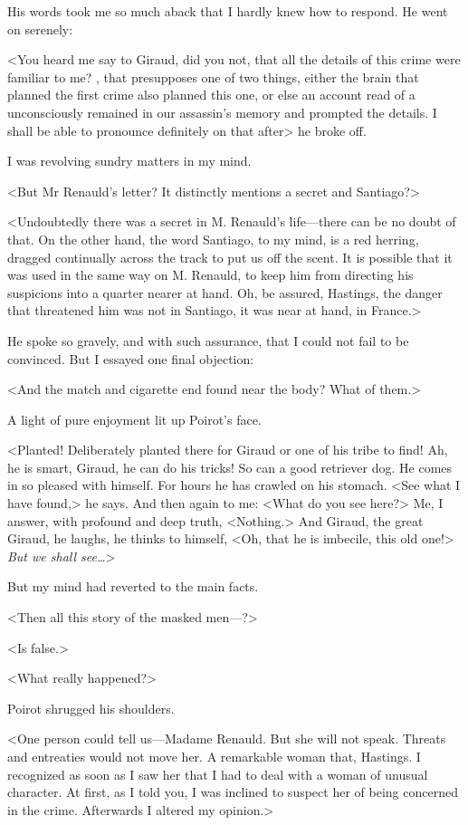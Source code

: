  His words took me so much aback that I hardly knew how to respond. He went on serenely: 

 <You heard me say to Giraud, did you not, that all the details of this crime were familiar to me? , that presupposes one of two things, either the brain that planned the first crime also planned this one, or else an account read of a  unconsciously remained in our assassin's memory and prompted the details. I shall be able to pronounce definitely on that after\longdash> he broke off. 

 I was revolving sundry matters in my mind. 

 <But Mr Renauld's letter? It distinctly mentions a secret and Santiago?> 

 <Undoubtedly there was a secret in M. Renauld's life—there can be no doubt of that. On the other hand, the word Santiago, to my mind, is a red herring, dragged continually across the track to put us off the scent. It is possible that it was used in the same way on M. Renauld, to keep him from directing his suspicions into a quarter nearer at hand. Oh, be assured, Hastings, the danger that threatened him was not in Santiago, it was near at hand, in France.> 

 He spoke so gravely, and with such assurance, that I could not fail to be convinced. But I essayed one final objection: 

 <And the match and cigarette end found near the body? What of them.> 

 A light of pure enjoyment lit up Poirot's face. 

 <Planted! Deliberately planted there for Giraud or one of his tribe to find! Ah, he is smart, Giraud, he can do his tricks! So can a good retriever dog. He comes in so pleased with himself. For hours he has crawled on his stomach. <See what I have found,> he says. And then again to me: <What do you see here?> Me, I answer, with profound and deep truth, <Nothing.> And Giraud, the great Giraud, he laughs, he thinks to himself, <Oh, that he is imbecile, this old one!> \emph{But we shall see\dots}> 

 But my mind had reverted to the main facts. 

 <Then all this story of the masked men—?> 

 <Is false.> 

 <What really happened?> 

 Poirot shrugged his shoulders. 

 <One person could tell us—Madame Renauld. But she will not speak. Threats and entreaties would not move her. A remarkable woman that, Hastings. I recognized as soon as I saw her that I had to deal with a woman of unusual character. At first, as I told you, I was inclined to suspect her of being concerned in the crime. Afterwards I altered my opinion.> 

